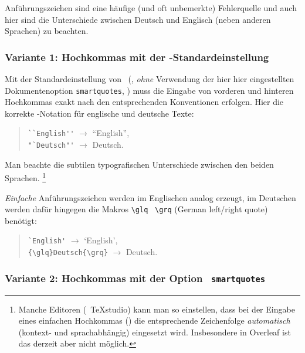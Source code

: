 Anführungszeichen sind eine häufige (und oft unbemerkte) Fehlerquelle und
auch hier sind die Unterschiede zwischen Deutsch und Englisch (neben anderen
Sprachen) zu beachten.

\subsubsection{Variante 1: Hochkommas mit der \latex-Standardeinstellung}

Mit der Standardeinstellung von \latex\ (\dah, \emph{ohne} Verwendung der
hier hier eingestellten Dokumentenoption \texttt{\texttt{smartquotes}}, \su)
muss die Eingabe von vorderen und hinteren Hochkommas exakt nach den
entsprechenden Konventionen erfolgen. Hier die korrekte \latex-Notation für
englische und deutsche Texte:
%
\begin{quote}
    \verb!``English''! $\rightarrow$ ``English'',\\
    \verb!"`Deutsch"'! $\rightarrow$ {\glqq}Deutsch{\grqq}.
\end{quote}
%
Man beachte die subtilen typografischen Unterschiede zwischen den beiden
Sprachen.%
\footnote{Manche Editoren (\zB\ \textsf{TeXstudio}) kann man so einstellen,
    dass bei der Eingabe eines einfachen Hochkommas (\texttt{\textquotedbl})
    die entsprechende Zeichenfolge \emph{automatisch} (kontext- und
    sprachabhängig) eingesetzt wird. Insbesondere in \textsf{Overleaf} ist
    das derzeit aber nicht möglich.}

\emph{Einfache} Anführungszeichen werden im Englischen analog erzeugt,
im Deutschen werden dafür hingegen die Makros \verb!\glq! \bzw\ \verb!\grq!
(German left/right quote) benötigt:
%
\begin{quote}
    \verb!`English'! $\rightarrow$ `English',\\
    \verb!{\glq}Deutsch{\grq}! $\rightarrow$ {\glq}Deutsch{\grq}.
\end{quote}

\subsubsection{Variante 2: Hochkommas mit der Option \texttt{\bfseries
smartquotes}}


